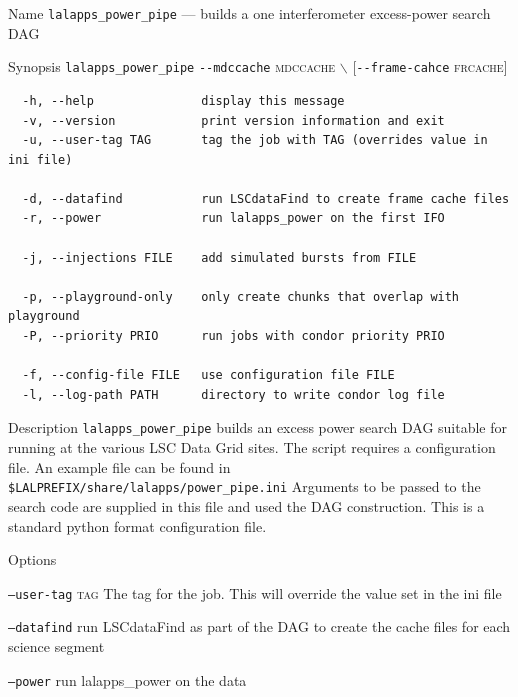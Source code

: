 \begin{entry}

\item[Name]
\verb$lalapps_power_pipe$ --- builds a one interferometer
excess-power search DAG   

\item[Synopsis]
\verb$lalapps_power_pipe$ 
\verb$--mdccache$ \textsc{mdccache}
$\backslash$ \newline \hspace*{0.25in}
[\verb$--frame-cahce$ \textsc{frcache}]
\begin{verbatim}
  -h, --help               display this message
  -v, --version            print version information and exit
  -u, --user-tag TAG       tag the job with TAG (overrides value in ini file)

  -d, --datafind           run LSCdataFind to create frame cache files
  -r, --power              run lalapps_power on the first IFO

  -j, --injections FILE    add simulated bursts from FILE

  -p, --playground-only    only create chunks that overlap with playground
  -P, --priority PRIO      run jobs with condor priority PRIO

  -f, --config-file FILE   use configuration file FILE
  -l, --log-path PATH      directory to write condor log file
\end{verbatim}

\item[Description] 
\verb$lalapps_power_pipe$ builds an excess power search DAG suitable
for running at the various LSC Data Grid sites.   The script requires
a configuration file.   An example file can be found in
\verb+$LALPREFIX/share/lalapps/power_pipe.ini+    Arguments to be
passed to the search code are supplied in this file and used the DAG
construction.    This is a standard python format configuration file.

\item[Options]\leavevmode
\begin{entry}
\item[\texttt{--user-tag}  \textsc{tag}]   The tag for the job.  This
will override the value set in the ini file

\item[\texttt{--datafind}] run LSCdataFind as part of the DAG to
create the cache files for each science segment

\item[\texttt{--power}] run lalapps\_power on the data


\end{entry}
\end{entry}
